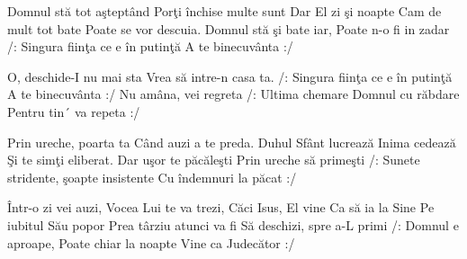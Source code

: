 
\beginverse
Domnul stă tot aşteptând
Porţi închise multe sunt
Dar El zi şi noapte
Cam de mult tot bate
Poate se vor descuia.
Domnul stă şi bate iar,
Poate n-o fi in zadar
/: Singura fiinţa ce e în putinţă
A te binecuvânta :/
\endverse

\beginchorus
O, deschide-I nu mai sta
Vrea să intre-n casa ta.
/: Singura fiinţa ce e în putinţă
A te binecuvânta :/
Nu amâna, vei regreta
/: Ultima chemare Domnul cu răbdare
Pentru tin´ va repeta :/
\endchorus

\beginverse
Prin ureche, poarta ta
Când auzi a te preda.
Duhul Sfânt lucrează
Inima cedează
Şi te simţi eliberat.
Dar uşor te păcăleşti
Prin ureche să primeşti
/: Sunete stridente, şoapte insistente
Cu îndemnuri la păcat :/
\endverse

\beginverse
Într-o zi vei auzi,
Vocea Lui te va trezi,
Căci Isus, El vine
Ca să ia la Sine
Pe iubitul Său popor
Prea târziu atunci va fi
Să deschizi, spre a-L primi
/: Domnul e aproape,
Poate chiar la noapte
Vine ca Judecător :/
\endverse

\endsong

